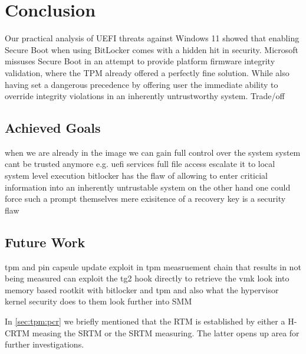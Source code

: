 
\chapter{Conclusion}

Our practical analysis of \ac{UEFI} threats against Windows 11 showed that enabling Secure Boot when using BitLocker comes with a hidden hit in security.
Microsoft missuses Secure Boot in an attempt to provide platform firmware integrity validation, where the \ac{TPM} already offered a perfectly fine solution.
While also having set a dangerous precedence by offering user the immediate ability to override integrity violations in an inherently untrustworthy system.
Trade\-/off


\section{Achieved Goals}

when we are already in the image we can gain full control over the system
system cant be trusted anymore e.g. uefi services
full file access
escalate it to local system level execution
bitlocker has the flaw of allowing to enter criticial information into an inherently untrustable system
on the other hand one could force such a prompt themselves
mere exisitence of a recovery key is a security flaw

\section{Future Work}

tpm and pin
capsule update
exploit in tpm measruement chain that results in not being measured
can exploit the tg2 hook directly to retrieve the vmk
look into memory based rootkit with bitlocker and tpm and also what the hypervisor kernel security does to them
look further into \ac{SMM}

In \autoref{sec:tpm:pcr} we briefly mentioned that the \ac{RTM} is established by either a \ac{H-CRTM} measing the \ac{SRTM} or the \ac{SRTM} measuring.
The latter opens up area for further investigations.